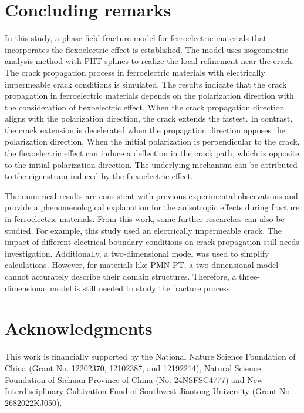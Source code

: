 \documentclass[times,fleqn,11pt]{elsarticle}
\begin{document}
\section{Concluding remarks}\label{Section5}
In this study, a phase-field fracture model for ferroelectric materials that incorporates the flexoelectric effect is established. The model uses isogeometric analysis method with PHT-splines to realize the local refinement near the crack. The crack propagation process in ferroelectric materials with electrically impermeable crack conditions is simulated. The results indicate that the crack propagation in ferroelectric materials depends on the polarization direction with the consideration of flexoelectric effect. When the crack propagation direction aligns with the polarization direction, the crack extends the fastest. In contrast, the crack extension is decelerated when the propagation direction opposes the polarization direction. When the initial polarization is perpendicular to the crack, the flexoelectric effect can induce a deflection in the crack path, which is opposite to the initial polarization direction. The underlying mechanism can be attributed to the eigenstrain induced by the flexoelectric effect.

The numerical results are consistent with previous experimental observations  and  provide a phenomenological explanation for the anisotropic effects during fracture in ferroelectric materials. From this work, some further researches can also be studied. For example, this study used an electrically impermeable crack. The impact of different electrical boundary conditions on crack propagation still needs investigation. Additionally, a two-dimensional model was used to simplify calculations. However, for materials like PMN-PT, a two-dimensional model cannot accurately describe their domain structures. Therefore, a three-dimensional model is still needed to study the fracture process.

\section*{Acknowledgments}
This work is financially supported by the National Nature Science Foundation of China (Grant No. 12202370, 12102387, and 12192214), Natural Science Foundation of Sichuan Province of China (No. 24NSFSC4777) and New Interdisciplinary Cultivation Fund of Southwest Jiaotong University (Grant No. 2682022KJ050).
\end{document}
